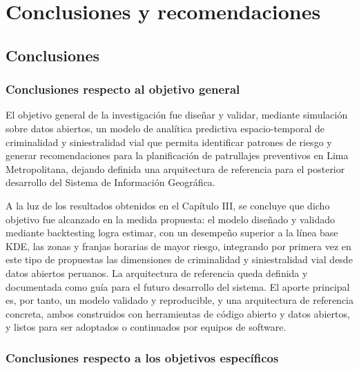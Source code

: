 
\chapter{Conclusiones y recomendaciones}

\section{Conclusiones}

\subsection{Conclusiones respecto al objetivo general}

El objetivo general de la investigaci\'on fue dise\~nar y validar, mediante simulaci\'on sobre datos abiertos, un modelo de anal\'itica predictiva espacio-temporal de criminalidad y siniestralidad vial que permita identificar patrones de riesgo y generar recomendaciones para la planificaci\'on de patrullajes preventivos en Lima Metropolitana, dejando definida una arquitectura de referencia para el posterior desarrollo del Sistema de Informaci\'on Geogr\'afica.

A la luz de los resultados obtenidos en el Cap\'itulo III, se concluye que dicho objetivo fue alcanzado en la medida propuesta: el modelo dise\~nado y validado mediante backtesting logra estimar, con un desempe\~no superior a la l\'inea base KDE, las zonas y franjas horarias de mayor riesgo, integrando por primera vez en este tipo de propuestas las dimensiones de criminalidad y siniestralidad vial desde datos abiertos peruanos. La arquitectura de referencia queda definida y documentada como gu\'ia para el futuro desarrollo del sistema. El aporte principal es, por tanto, un modelo validado y reproducible, y una arquitectura de referencia concreta, ambos construidos con herramientas de c\'odigo abierto y datos abiertos, y listos para ser adoptados o continuados por equipos de software.

\subsection{Conclusiones respecto a los objetivos espec\'ificos}

